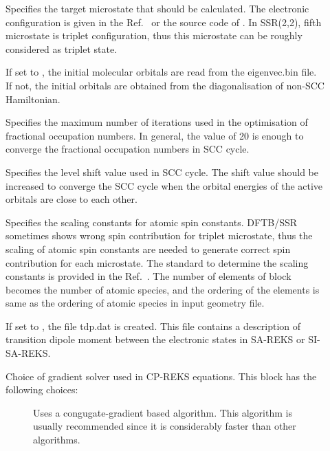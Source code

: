 \begin{description}
\item[] Specifies the target microstate that should be calculated. The electronic
  configuration is given in the Ref.~\cite{Lee_JCTC_2019} or the source code of \dftbp{}. In SSR(2,2),
  fifth microstate is triplet configuration, thus this microstate can be roughly considered as triplet state.

\item[] If set to , the initial molecular orbitals are read from the
  eigenvec.bin file. If not, the initial orbitals are obtained from the diagonalisation of non-SCC Hamiltonian.

\item[] Specifies the maximum number of iterations used in the optimisation of
  fractional occupation numbers. In general, the value of 20 is enough to converge the fractional
  occupation numbers in SCC cycle.

\item[] Specifies the level shift value used in SCC cycle. The shift value should be increased
  to converge the SCC cycle when the orbital energies of the active orbitals are close to each other.

\item[] Specifies the scaling constants for atomic spin constants. DFTB/SSR sometimes
  shows wrong spin contribution for triplet microstate, thus the scaling of atomic spin constants are needed
  to generate correct spin contribution for each microstate. The standard to determine the scaling constants
  is provided in the Ref.~\cite{Lee_JCTC_2019}. The number of elements of  block becomes the number of
  atomic species, and the ordering of the elements is same as the ordering of atomic species in input geometry file.

\item[] If set to , the file tdp.dat is created. This file contains a
  description of transition dipole moment between the electronic states in SA-REKS or SI-SA-REKS.

\item[] Choice of gradient solver used in CP-REKS equations. This  block has the following choices:

  \begin{description}
  \item[] Uses a congugate-gradient based algorithm. This
    algorithm is usually recommended since it is considerably faster than other algorithms.


\end{description}
\end{description}
